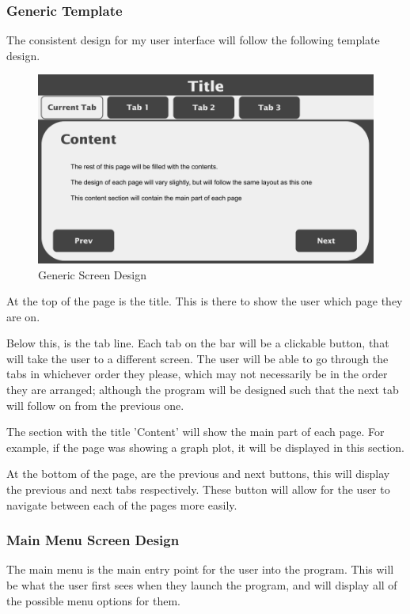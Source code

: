 \documentclass{article}
\begin{document}
\subsubsection{Generic Template}
The consistent design for my user interface will follow the following template design.

\begin{figure}[ht]
    \centering
    \includegraphics[scale=0.3]{template-screen-design}
    \caption{Generic Screen Design}
\end{figure}

At the top of the page is the title. This is there to show the user which page they are on.

Below this, is the tab line. Each tab on the bar  will be a clickable button, that will take the user to a different screen. The user will be able to go through the tabs in whichever order they please, which may not necessarily be in the order they are arranged; although the program will be designed such that the next tab will follow on from the previous one.

The section with the title 'Content' will show the main part of each page. For example, if the page was showing a graph plot, it will be displayed in this section.

At the bottom of the page, are the previous and next buttons, this will display the previous and next tabs respectively. These button will allow for the user to navigate between each of the pages more easily.

\clearpage
\subsubsection{Main Menu Screen Design}

The main menu is the main entry point for the user into the program. This will be what the user first sees when they launch the program, and will display all of the possible menu options for them.
\end{document}
